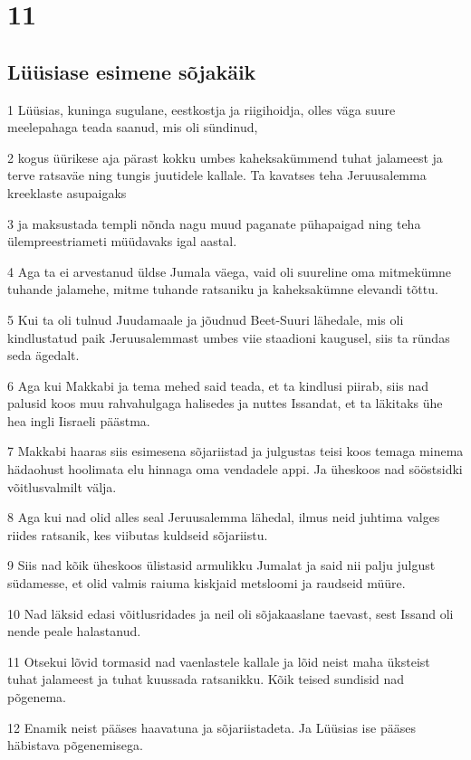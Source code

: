 \chapter{11}


\section*{Lüüsiase esimene sõjakäik}

\par 1 Lüüsias, kuninga sugulane, eestkostja ja riigihoidja, olles väga suure meelepahaga teada saanud, mis oli sündinud,
\par 2 kogus üürikese aja pärast kokku umbes kaheksakümmend tuhat jalameest ja terve ratsaväe ning tungis juutidele kallale. Ta kavatses teha Jeruusalemma kreeklaste asupaigaks
\par 3 ja maksustada templi nõnda nagu muud paganate pühapaigad ning teha ülempreestriameti müüdavaks igal aastal.
\par 4 Aga ta ei arvestanud üldse Jumala väega, vaid oli suureline oma mitmekümne tuhande jalamehe, mitme tuhande ratsaniku ja kaheksakümne elevandi tõttu.
\par 5 Kui ta oli tulnud Juudamaale ja jõudnud Beet-Suuri lähedale, mis oli kindlustatud paik Jeruusalemmast umbes viie staadioni kaugusel, siis ta ründas seda ägedalt.
\par 6 Aga kui Makkabi ja tema mehed said teada, et ta kindlusi piirab, siis nad palusid koos muu rahvahulgaga halisedes ja nuttes Issandat, et ta läkitaks ühe hea ingli Iisraeli päästma.
\par 7 Makkabi haaras siis esimesena sõjariistad ja julgustas teisi koos temaga minema hädaohust hoolimata elu hinnaga oma vendadele appi. Ja üheskoos nad sööstsidki võitlusvalmilt välja.
\par 8 Aga kui nad olid alles seal Jeruusalemma lähedal, ilmus neid juhtima valges riides ratsanik, kes viibutas kuldseid sõjariistu.
\par 9 Siis nad kõik üheskoos ülistasid armulikku Jumalat ja said nii palju julgust südamesse, et olid valmis raiuma kiskjaid metsloomi ja raudseid müüre.
\par 10 Nad läksid edasi võitlusridades ja neil oli sõjakaaslane taevast, sest Issand oli nende peale halastanud.
\par 11 Otsekui lõvid tormasid nad vaenlastele kallale ja lõid neist maha üksteist tuhat jalameest ja tuhat kuussada ratsanikku. Kõik teised sundisid nad põgenema.
\par 12 Enamik neist pääses haavatuna ja sõjariistadeta. Ja Lüüsias ise pääses häbistava põgenemisega.


